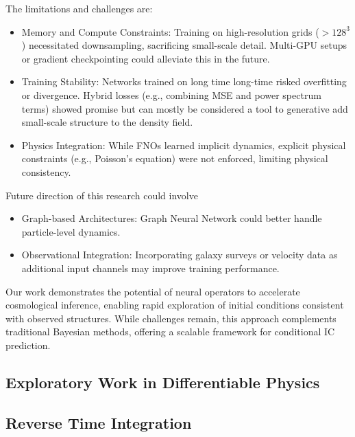 \documentclass{article}
\begin{document}
{The limitations and challenges are:

\begin{itemize}
    \item Memory and Compute Constraints: Training on high-resolution grids ($>128^3$) necessitated downsampling, sacrificing small-scale detail. Multi-GPU setups or gradient checkpointing could alleviate this in the future.
    \item Training Stability: Networks trained on long time long-time risked overfitting or divergence. Hybrid losses (e.g., combining MSE and power spectrum terms) showed promise but can mostly be considered a tool to generative add small-scale structure to the density field.
    \item  Physics Integration: While FNOs learned implicit dynamics, explicit physical constraints (e.g., Poisson’s equation) were not enforced, limiting physical consistency.
\end{itemize}

Future direction of this research could involve

\begin{itemize}
    \item  Graph-based Architectures: Graph Neural Network could  better handle particle-level dynamics.
    \item Observational Integration: Incorporating galaxy surveys or velocity data as additional input channels may improve training performance.
\end{itemize}

Our work demonstrates the potential of neural operators to accelerate cosmological inference, enabling rapid exploration of initial conditions consistent with observed structures. While challenges remain, this approach complements traditional Bayesian methods, offering a scalable framework for conditional IC prediction. 

\newpage

\begin{appendices}

\section{Exploratory Work in Differentiable Physics}

\subsection{Reverse Time Integration}
\label{rev-integration}


\end{appendices}}
\end{document}
